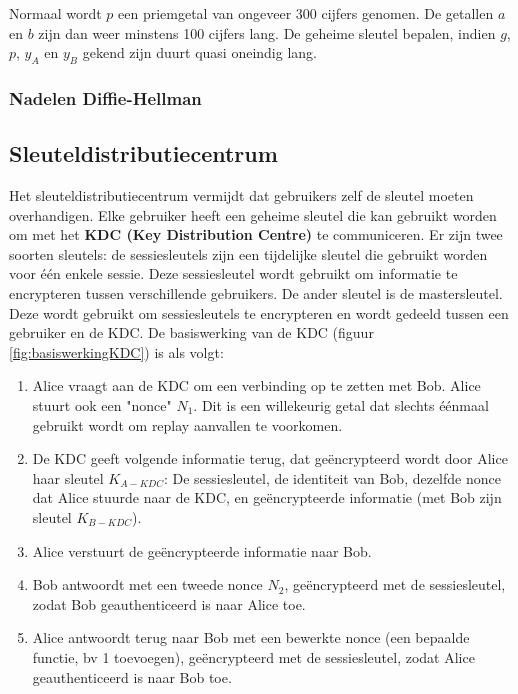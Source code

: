 \documentclass{report}
\begin{document}
	 Normaal wordt $p$ een priemgetal van ongeveer 300 cijfers genomen. De getallen $a$ en $b$ zijn dan weer minstens 100 cijfers lang. De geheime sleutel bepalen, indien $g$, $p$, $y_A$ en $y_B$ gekend zijn duurt quasi oneindig lang. 

	\subsubsection{Nadelen Diffie-Hellman}

	\subsection{Sleuteldistributiecentrum}
	Het sleuteldistributiecentrum vermijdt dat gebruikers zelf de sleutel moeten overhandigen. Elke gebruiker heeft een geheime sleutel die kan gebruikt worden om met het \textbf{KDC (Key Distribution Centre)} te communiceren. Er zijn twee soorten sleutels: de sessiesleutels zijn een tijdelijke sleutel die gebruikt worden voor één enkele sessie. Deze sessiesleutel wordt gebruikt om informatie te encrypteren tussen verschillende gebruikers. De ander sleutel is de mastersleutel. Deze wordt gebruikt om sessiesleutels te encrypteren en wordt gedeeld tussen een gebruiker en de KDC. De basiswerking van de KDC (figuur \ref{fig:basiswerkingKDC}) is als volgt:
	\begin{enumerate}
		\item Alice vraagt aan de KDC om een verbinding op te zetten met Bob. Alice stuurt ook een "nonce" $N_1$. Dit is een willekeurig getal dat slechts éénmaal gebruikt wordt om replay aanvallen te voorkomen.
		\item De KDC geeft volgende informatie terug, dat geëncrypteerd wordt door Alice haar sleutel $K_{A-KDC}$: De sessiesleutel, de identiteit van Bob, dezelfde nonce dat Alice stuurde naar de KDC, en geëncrypteerde informatie (met Bob zijn sleutel $K_{B-KDC}$).
		\item Alice verstuurt de geëncrypteerde informatie naar Bob.
		\item Bob antwoordt met een tweede nonce $N_2$, geëncrypteerd met de sessiesleutel, zodat Bob geauthenticeerd is naar Alice toe.
		\item Alice antwoordt terug naar Bob met een bewerkte nonce (een bepaalde functie, bv 1 toevoegen), geëncrypteerd met de sessiesleutel, zodat Alice geauthenticeerd is naar Bob toe.
	\end{enumerate}
\end{document}
